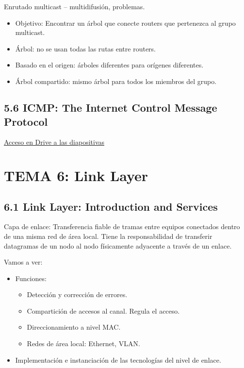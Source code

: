 \documentclass[12pt, twoside, openright]{report} %
\begin{document}
Enrutado multicast -- multidifusión, problemas.

\begin{itemize}
	\item Objetivo: Encontrar un árbol que conecte routers que pertenezca al
	      grupo multicast.
	\item Árbol: no se usan todas las rutas entre routers.
	\item Basado en el origen: árboles diferentes para orígenes diferentes.
	\item Árbol compartido: mismo árbol para todos los miembros del grupo.
\end{itemize}

\section{5.6 ICMP: The Internet Control Message Protocol}
\href{https://drive.google.com/file/d/1B-h5Mxn93RJ-fWKjj9H8U_rHdbnS8vVq/view?usp=sharing}{Acceso en Drive a las diapositivas}

\chapter{TEMA 6: Link Layer}

\section{6.1 Link Layer: Introduction and Services}

Capa de enlace: Transferencia fiable de tramas entre equipos
conectados dentro de una misma red de área local. Tiene la
responsabilidad de transferir datagramas de un nodo al nodo
físicamente adyacente a través de un enlace.

Vamos a ver:

\begin{itemize}
	\item Funciones:

	      \begin{itemize}
		      \item Detección y corrección de errores.
		      \item Compartición de accesos al canal. Regula el acceso.
		      \item Direccionamiento a nivel MAC.
		      \item Redes de área local: Ethernet, VLAN.
	      \end{itemize}
	\item Implementación e instanciación de las tecnologías del nivel de
	      enlace.
\end{itemize}
\end{document}
